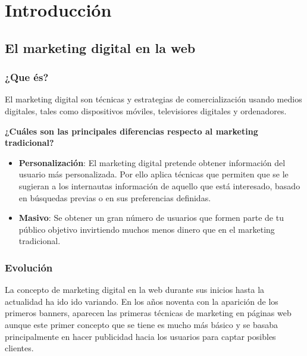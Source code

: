\chapter{Introducción}


\section{El marketing digital en la web}


\subsection{¿Que és?}

El marketing digital son técnicas y estrategias de comercialización usando medios digitales, tales como dispositivos móviles, televisiores digitales y ordenadores.

\vspace{5 mm}

\textbf{¿Cuáles son las principales diferencias respecto al marketing tradicional?} 

\vspace{5 mm}

\begin{itemize}

\item \textbf{Personalización}: El marketing digital pretende obtener información del usuario más personalizada. Por ello aplica técnicas que permiten que se le sugieran a los internautas información de aquello que está interesado, basado en búsquedas previas o en sus preferencias definidas.

\item \textbf{Masivo}: Se obtener un gran número de usuarios que formen parte de tu público objetivo invirtiendo muchos menos dinero que en el marketing tradicional.


\end{itemize}

\subsection{Evolución}

La concepto de marketing digital en la web durante sus inicios hasta la actualidad ha ido ido variando. En los años noventa con la aparición de los primeros banners, aparecen las primeras técnicas de marketing en páginas web aunque este primer concepto que se tiene es mucho más básico y se basaba principalmente en hacer publicidad hacia los usuarios para captar posibles clientes.

